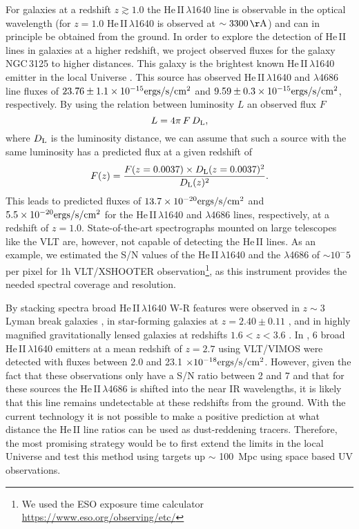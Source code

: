 \documentclass[]{aastex63}
\begin{document}
For galaxies at a redshift $z\gtrsim1.0$ the He\,II\,$\lambda$1640 line is observable in the optical wavelength (for $z=1.0$ He\,II\,$\lambda$1640 is observed at $\sim 3300\,{\rm \AA}$) and can in principle be obtained from the ground. 
In order to explore the detection of He\,II lines in galaxies at a higher redshift, we project observed fluxes  for the galaxy NGC\,3125 to higher distances. This galaxy is the brightest known He\,II\,$\lambda$1640 emitter in the local Universe \citep{chandar_ngc_2004}.  
This source has observed He\,II\,$\lambda$1640 and $\lambda$4686 line fluxes of $23.76\pm1.1 \times 10^{-15}{\rm ergs/s/cm^2}$ and $9.59\pm0.3 \times 10^{-15}{\rm ergs/s/cm^2}$, respectively. 
By using the relation between luminosity $L$ an observed flux $F$ 
\begin{equation}
    L = 4\pi\,F\,D_{\rm L},
\end{equation}
where $D_{\rm L}$ is the luminosity distance, we can assume that such a source with the same luminosity has a predicted flux at a given redshift of
\begin{equation}
    F(z) = \frac{F(z=0.0037) \times D_{\rm L}(z=0.0037)^2}{D_{\rm L}(z)^2}.
\end{equation}
This leads to predicted fluxes of $13.7 \times 10^{-20}{\rm ergs/s/cm^2}$ and $5.5 \times 10^{-20}{\rm ergs/s/cm^2}$ for the He\,II\,$\lambda$1640 and $\lambda$4686 lines, respectively, at a redshift of $z=1.0$. 
State-of-the-art spectrographs mounted on large telescopes like the VLT are, however, not capable of detecting the He\,II lines. 
As an example, we estimated the S/N values of the He\,II\,$\lambda$1640 and the $\lambda$4686 of $\sim10^-5$ per pixel for 1h VLT/XSHOOTER observation\footnote{We used the ESO exposure time calculator \url{https://www.eso.org/observing/etc/}}, as this instrument provides the needed spectral coverage and resolution. 

By stacking spectra broad He\,II\,$\lambda$1640 W-R features were observed in $z\sim3$ Lyman break galaxies \citep[$N\sim 1000$;][]{shapley_rest-frame_2003}, in star-forming galaxies at $z = 2.40\pm0.11$ \citep[$N\sim 30$; ][]{steidel_reconciling_2016}, and in highly magnified gravitationally lensed galaxies at redshifts
$1.6 < z < 3.6$ \citep[$N\sim 14$; ][]{rigby_magellan_2018}. 
In \citet{saxena_properties_2020}, 6 broad He\,II\,$\lambda$1640 emitters at a mean redshift of $z=2.7$ using VLT/VIMOS were detected with fluxes between 2.0 and 23.1 $\times 10^{-18}{\rm ergs/s/cm^2}$. 
However, given the fact that these observations only have a S/N ratio between 2 and 7 and that for these sources the He\,II\,$\lambda$4686 is shifted into the near IR wavelengths, it is likely that this line remains undetectable at these redshifts from the ground. With the current technology it is not possible to make a positive prediction at what distance the He\,II line ratios can be used as dust-reddening tracers. Therefore, the most promising strategy would be to first extend the limits in the local Universe and test this method using  targets up $\sim$ 100~Mpc using space based UV observations.
\end{document}

